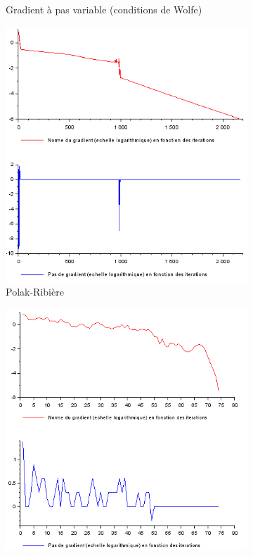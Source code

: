 \documentclass{article}
\begin{document}
\begin{figure}
\begin{subfigure}[t]{.4\textwidth}
                \caption{Gradient à pas variable (conditions de Wolfe)}
                \label{fig:pas_variable_dual}
            \end{subfigure}
            \hfill
            \begin{subfigure}[t]{.4\textwidth}
                \includegraphics[width=\textwidth]{../Images/Polak_Ribiere_dual.png}
                \caption{Polak-Ribière}
                \label{fig:Polak_Ribiere}
            \end{subfigure}
            \hfill
            \begin{subfigure}[t]{.4\textwidth}
                \includegraphics[width=\textwidth]{../Images/BFGS_dual.png}

\end{subfigure}
\end{figure}
\end{document}

